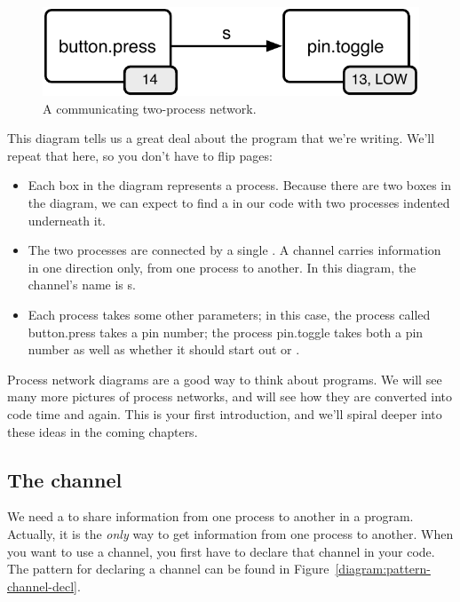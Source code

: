 \begin{figure}[h]
  \begin{center}
    \includegraphics[width=0.8\linewidth]{images/button-toggle-led}
    \caption{A communicating two-process network.}
    \label{diagram:button-toggle-led}
  \end{center}
\end{figure}

This diagram tells us a great deal about the \plumbing program that we're writing. We'll repeat that here, so you don't have to flip pages:



\begin{itemize}
	\item Each box in the diagram represents a process. Because there are two boxes in the diagram, we can expect to find a \PAR in our code with two processes indented underneath it. 
	\item The two processes are connected by a single \CHANnel. A channel carries information in one direction only, from one process to another. In this diagram, the channel's name is {\code s}.
	\item Each process takes some other parameters; in this case, the process called {\procname button.press} takes a pin number; the process {\procname pin.toggle} takes both a pin number as well as whether it should start out \LOW or \HIGH.
\end{itemize}

Process network diagrams are a good way to think about \plumbing programs. We will see many more pictures of process networks, and will see how they are converted into code time and again. This is your first introduction, and we'll spiral deeper into these ideas in the coming chapters.

\subsection{The channel}
We need a \CHANnel to share information from one process to another in a \plumbing program. Actually, it is the {\em only} way to get information from one process to another. When you want to use a channel, you first have to {\strong declare} that channel in your code. The pattern for declaring a channel can be found in Figure~\vref{diagram:pattern-channel-decl}.

